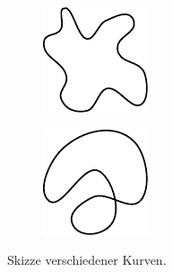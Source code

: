 \begin{figure}[h!]\label{im:chap3:jKurve}
\center
\begin{subfigure}[c]{.3\textwidth}
\includegraphics[width=.9\linewidth]{images/jKurve}
\end{subfigure}
\qquad
\begin{subfigure}[c]{.3\textwidth}
\includegraphics[width=.9\linewidth]{images/nJKurve}
\end{subfigure}
\caption{Skizze verschiedener Kurven.}
\end{figure}

